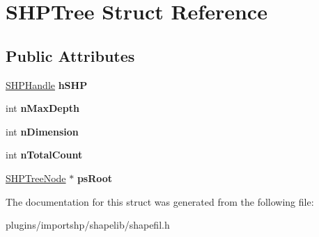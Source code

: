\hypertarget{structSHPTree}{\section{S\-H\-P\-Tree Struct Reference}
\label{structSHPTree}
}
\subsection*{Public Attributes}
\begin{DoxyCompactItemize}
\item 
\hypertarget{structSHPTree_a7ddad23921595458aaef92d785b0dd64}{\hyperlink{structSHPInfo}{S\-H\-P\-Handle} {\bfseries h\-S\-H\-P}}\label{structSHPTree_a7ddad23921595458aaef92d785b0dd64}

\item 
\hypertarget{structSHPTree_ad035693b5a02694ded9513796a6ea462}{int {\bfseries n\-Max\-Depth}}\label{structSHPTree_ad035693b5a02694ded9513796a6ea462}

\item 
\hypertarget{structSHPTree_aa2155006272f1c6ce320c8c1142aad7f}{int {\bfseries n\-Dimension}}\label{structSHPTree_aa2155006272f1c6ce320c8c1142aad7f}

\item 
\hypertarget{structSHPTree_ae312b8a6a489643a10018cc1860fca96}{int {\bfseries n\-Total\-Count}}\label{structSHPTree_ae312b8a6a489643a10018cc1860fca96}

\item 
\hypertarget{structSHPTree_a20a5c9e372e2deb2f4558c4d481e6194}{\hyperlink{structshape__tree__node}{S\-H\-P\-Tree\-Node} $\ast$ {\bfseries ps\-Root}}\label{structSHPTree_a20a5c9e372e2deb2f4558c4d481e6194}

\end{DoxyCompactItemize}


The documentation for this struct was generated from the following file\-:\begin{DoxyCompactItemize}
\item 
plugins/importshp/shapelib/shapefil.\-h\end{DoxyCompactItemize}
